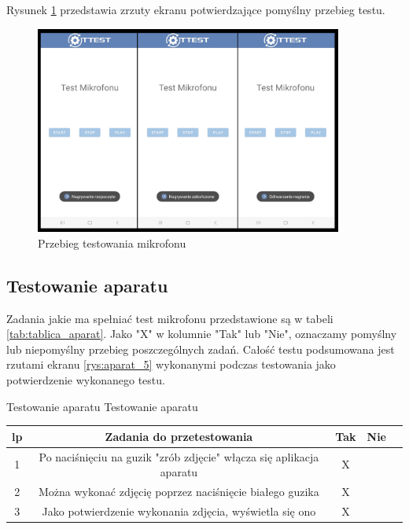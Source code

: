 Rysunek \ref{rys:mikrofon_5} przedstawia zrzuty ekranu potwierdzające pomyślny przebieg testu.

\begin{figure}[!hbt]
	\begin{center}
		\includegraphics[angle=360, width=0.90\textwidth]{rys/punkt5/mikrofon.png}
		\caption{Przebieg testowania mikrofonu}
		\label{rys:mikrofon_5}
	\end{center}
\end{figure} 

\newpage


\subsection{Testowanie aparatu}

\hspace{0.60cm}Zadania jakie ma spełniać test mikrofonu przedstawione są w tabeli \ref{tab:tablica_aparat}. Jako "X" w kolumnie "Tak" lub "Nie", oznaczamy pomyślny lub niepomyślny przebieg poszczególnych zadań. Całość testu podsumowana jest rzutami ekranu \ref{rys:aparat_5} wykonanymi podczas testowania jako potwierdzenie wykonanego testu.

\begin{tabela}
	{Testowanie aparatu}	%
	{Testowanie aparatu}	%
	{
		\begin{tabular}{|c|c|c|c|c|} \hline
			\textbf{lp} & \textbf{Zadania do przetestowania} & \textbf{Tak} & \textbf{Nie} \\ \hline
			1 & Po naciśnięciu na guzik "zrób zdjęcie" włącza się aplikacja aparatu & X & ~ \\ \hline
			2 & Można wykonać zdjęcię poprzez naciśnięcie białego guzika & X & ~ \\ \hline
			3 & Jako potwierdzenie wykonania zdjęcia, wyświetla się ono & X & ~ \\ \hline
	\end{tabular}	}
	\label{tab:tablica_aparat}
\end{tabela}

